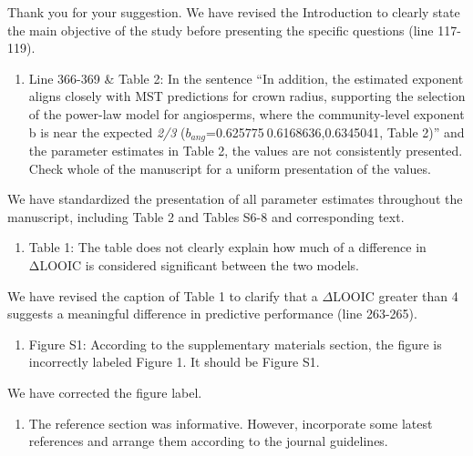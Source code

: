 \documentclass[
  12pt,
  letterpaper,
  DIV=11,
  numbers=noendperiod]{scrartcl}
\providecommand{\tightlist}{%
  \setlength{\itemsep}{0pt}\setlength{\parskip}{0pt}}\usepackage{longtable,booktabs,array}
\renewenvironment{quote}
  {\begin{customblockquote}\color{blockquote-text}\ignorespaces}
  {\end{customblockquote}}
\begin{document}
Thank you for your suggestion. We have revised the Introduction to
clearly state the main objective of the study before presenting the
specific questions (line 117-119).

\begin{quote}
\begin{enumerate}
\def\labelenumi{\arabic{enumi})}
\setcounter{enumi}{3}
\tightlist
\item
  Line 366-369 \& Table 2: In the sentence ``In addition, the estimated
  exponent aligns closely with MST predictions for crown radius,
  supporting the selection of the power-law model for angiosperms, where
  the community-level exponent b is near the expected \emph{2/3}
  (\(b_{ang}\)=0.625775 0.6168636,0.6345041, Table 2)'' and the
  parameter estimates in Table 2, the values are not consistently
  presented. Check whole of the manuscript for a uniform presentation of
  the values.
\end{enumerate}
\end{quote}

We have standardized the presentation of all parameter estimates
throughout the manuscript, including Table 2 and Tables S6-8 and
corresponding text.

\begin{quote}
\begin{enumerate}
\def\labelenumi{\arabic{enumi})}
\setcounter{enumi}{4}
\tightlist
\item
  Table 1: The table does not clearly explain how much of a difference
  in ΔLOOIC is considered significant between the two models.
\end{enumerate}
\end{quote}

We have revised the caption of Table 1 to clarify that a \(\Delta\)LOOIC
greater than 4 suggests a meaningful difference in predictive
performance (line 263-265).

\begin{quote}
\begin{enumerate}
\def\labelenumi{\arabic{enumi})}
\setcounter{enumi}{5}
\tightlist
\item
  Figure S1: According to the supplementary materials section, the
  figure is incorrectly labeled Figure 1. It should be Figure S1.
\end{enumerate}
\end{quote}

We have corrected the figure label.

\begin{quote}
\begin{enumerate}
\def\labelenumi{\arabic{enumi})}
\setcounter{enumi}{6}
\tightlist
\item
  The reference section was informative. However, incorporate some
  latest references and arrange them according to the journal
  guidelines.
\end{enumerate}
\end{quote}
\end{document}
